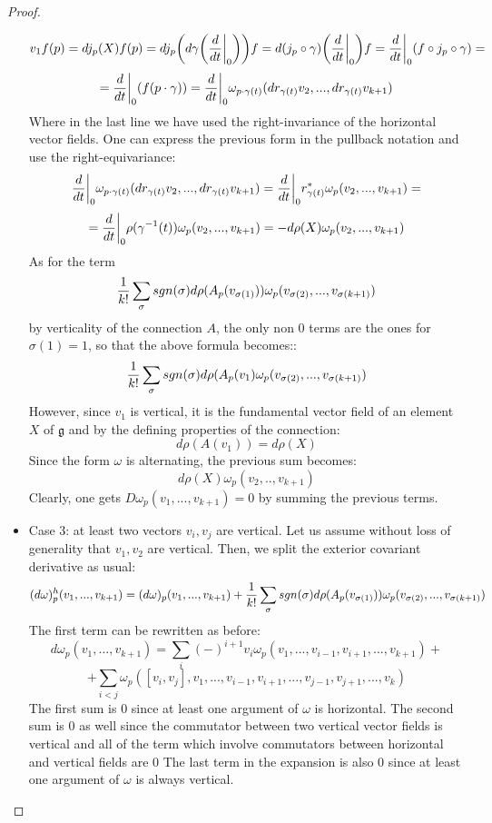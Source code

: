 \documentclass[12pt,a4paper]{report}
\theoremstyle{definition}
\theoremstyle{Theorem}
\theoremstyle{definition}
\theoremstyle{definition}
\begin{document}
\begin{proof}
\begin{itemize}
			$$v_1f(p)=dj_p(X)f(p)=dj_p\bigg( d\gamma\bigg({d\over dt}\bigg|_0\bigg)\bigg)f=d(j_p\circ \gamma)\bigg({d\over dt}\bigg|_0\bigg)f={d\over dt}\bigg|_0 (f\circ j_p\circ \gamma)=$$
			$$={d\over dt}\bigg|_0(f(p\cdot \gamma))={d\over dt}\bigg|_0\omega_{p\cdot \gamma(t)}(dr_{\gamma(t)}v_2,...,dr_{\gamma(t)}v_{k+1})$$
			Where in the last line we have used the right-invariance of the horizontal vector fields. One can express the previous form in the pullback notation and use the right-equivariance:
			$${d\over dt}\bigg|_0\omega_{p\cdot \gamma(t)}(dr_{\gamma(t)}v_2,...,dr_{\gamma(t)}v_{k+1})={d\over dt}\bigg|_0r^*_{\gamma(t)}\omega_{p}(v_2,...,v_{k+1})=$$
			$$={d\over dt}\bigg|_0\rho(\gamma^{-1}(t))\omega_{p}(v_2,...,v_{k+1})=-d\rho(X)\omega_{p}(v_2,...,v_{k+1})$$
			As for the term
			$${1\over k!}\sum_\sigma sgn(\sigma)d\rho(A_p(v_{\sigma(1)}))\omega_p(v_{\sigma(2)},...,v_{\sigma(k+1)})$$
			by verticality of the connection $A$, the only non 0 terms are the ones for $\sigma(1)=1$, so that the above formula becomes::
			$${1\over k!}\sum_\sigma sgn(\sigma)d\rho(A_p(v_1)\omega_p(v_{\sigma(2)},...,v_{\sigma(k+1)})$$
			However, since $v_1$ is vertical, it is the fundamental vector field of an element $X$ of $\mathfrak{g}$ and by the defining properties of the connection:
			$$d\rho(A(v_1))=d\rho(X)$$
			Since the form $\omega$ is alternating, the previous sum becomes:
			$$d\rho(X)\omega_p(v_2,..,v_{k+1})$$
			Clearly, one gets $D\omega_p(v_1,...,v_{k+1})=0$ by summing the previous terms.
			\item Case 3: at least two vectors $v_i,v_j$ are vertical. Let us assume without loss of generality that $v_1,v_2$ are vertical. Then, we split the exterior covariant derivative as usual:
			$$(d\omega)^h_p(v_1,...,v_{k+1})=(d\omega)_p(v_1,...,v_{k+1})+{1\over k!}\sum_\sigma sgn(\sigma)d\rho(A_p(v_{\sigma(1)}))\omega_p(v_{\sigma(2)},...,v_{\sigma(k+1)})$$
			The first term can be rewritten as before:
			$$d\omega_p(v_1,...,v_{k+1})=\sum_i (-)^{i+1}v_i\omega_p(v_1,...,v_{i-1},v_{i+1},...,v_{k+1})+$$
			$$+\sum_{i<j}\omega_p([v_i,v_j],v_1,...,v_{i-1},v_{i+1},...,v_{j-1},v_{j+1},...,v_k)$$
			The first sum is 0 since at least one argument of $\omega$ is horizontal. The second sum is 0 as well since the commutator between two vertical vector fields is vertical and all of the term which involve commutators between horizontal and vertical fields are 0
			The last term in the expansion is also 0 since at least one argument of $\omega$ is always vertical.
		\end{itemize}
	\end{proof}
\end{document}
